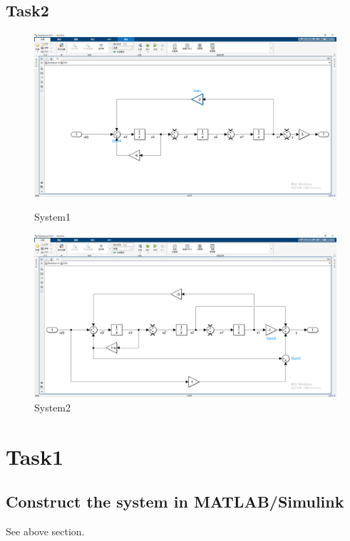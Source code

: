 \documentclass[12pt,a4paper,oneside]{ctexart}
\begin{document}
    \subsection{Task2}
    \begin{figure}
        \includegraphics[height = 0.35\textheight]{../screenshots/MT2S1.PNG}
        \caption{System1}
        \includegraphics[height = 0.35\textheight]{../screenshots/MT2S2.PNG}
        \caption{System2}
    \end{figure}

    \section{Task1}
    \subsection{Construct the system in MATLAB/Simulink}
    See above section.
\end{document}
